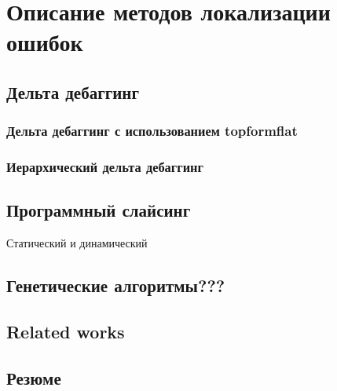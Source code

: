 \chapter{Описание методов локализации ошибок}
\section{Дельта дебаггинг}
\subsection{Дельта дебаггинг с использованием topformflat}
\subsection{Иерархический дельта дебаггинг}
\section{Программный слайсинг}
Статический и динамический 
\section{Генетические алгоритмы???}
\section{Related works}
\section{Резюме}
